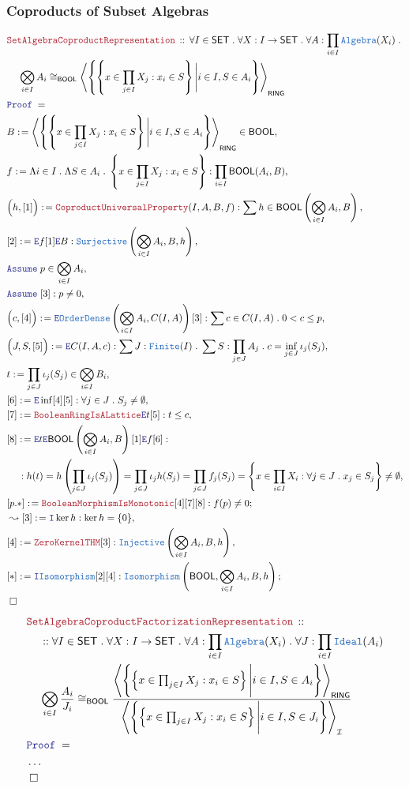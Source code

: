 \documentclass[12pt]{scrartcl}
\newcommand{\TYPE}[1]{\textcolor{NavyBlue}{\mathtt{#1}}}
\newcommand{\LOGIC}[1]{\textcolor{Blue}{\mathtt{#1}}}
\newcommand{\THM}[1]{\textcolor{Maroon}{\mathtt{#1}}}
\renewcommand{\.}{\; . \;}
\newcommand{\de}{: \kern 0.1pc =}
\newcommand{\Act}[1]{\left( #1 \right)}
\newcommand{\Theorem}[2]{& \THM{#1} \, :: \, #2 \\ & \Proof = \\ }
\newcommand{\NewLine}{\\ & \kern 1pc}
\newcommand{\Page}[1]{ \begin{align*} #1 \end{align*}   }
\newcommand{\NoProof}{ & \ldots \\ \EndProof}
\newcommand{\Intro}{\LOGIC{I}}
\newcommand{\Elim}{\LOGIC{E}}
\newcommand{\Surj}{\TYPE{Surjective}}
\newcommand{\Inj}{\TYPE{Injective}}
\newcommand{\Say}[3]{& #1 \de #2 : #3, \\}
\newcommand{\SayIn}[3]{& #1 \de #2 \in #3, \\}
\newcommand{\Conclude}[3]{& #1 \de #2 : #3; \\}
\newcommand{\Derive}[3]{& \leadsto #1 \de #2 : #3, \\}
\newcommand{\Assume}[2]{& \LOGIC{Assume} \; #1 : #2, \\}
\newcommand{\AssumeIn}[2]{& \LOGIC{Assume} \; #1 \in #2, \\}
\newcommand{\QED}{\; \square}
\newcommand{\EndProof}{& \QED \\}
\newcommand{\Proof}{\LOGIC{Proof} \; }
\newcommand{\Ideal}{\TYPE{Ideal}}
\newcommand{\I}{\mathcal{I}}
\newcommand{\SET}{\mathsf{SET}}
\newcommand{\RING}{\mathsf{RING}}
\newcommand{\Alg}{\TYPE{Algebra}}
\newcommand{\OD}{\TYPE{OrderDense}}
\newcommand{\BOOL}{\mathsf{BOOL}}
\begin{document}
\subsubsection{Coproducts of Subset Algebras}
\Page{
	\Theorem{SetAlgebraCoproductRepresentation}
	{
		\forall I \in \SET \.
		\forall X : I \to \SET \.
		\forall A : \prod_{i \in I} \Alg(X_i) \.
		\NewLine
		\bigotimes_{i \in I} A_i \cong_\BOOL
		\left\langle
			\left\{
				\left\{
						x \in \prod_{j \in I} X_j : x_i \in S
				\right\} \Bigg| i \in I, S \in A_i
			\right\}
		\right\rangle_{\RING}
	}
	\SayIn{B}{
		\left\langle
			\left\{
				\left\{
						x \in \prod_{j \in I} X_j : x_i \in S
				\right\} \Bigg| i \in I, S \in A_i
			\right\}
		\right\rangle_{\RING}
	}{\BOOL}	
	\Say{f}{
		\Lambda i \in I \. 
		\Lambda S \in A_i \. 
		\left\{
						x \in \prod_{j \in I} X_j : x_i \in S
		\right\}  
	}{ \prod_{i \in I} \BOOL(A_i,B)  }
	\Say{\Big(h, [1] \Big)}
	{
		\THM{CoproductUniversalProperty}(I,A,B,f)
	}
	{
		\sum h \in \BOOL\left( \bigotimes_{i \in I} A_i, B\right)
	}
	\Say{[2]}{ \Elim f [1]\Elim B }{\Surj\Act{\bigotimes_{i \in I} A_i,B,h}}
	\AssumeIn{p}{\bigotimes_{i \in I} A_i}
	\Assume{[3]}{p \neq 0}	
	\Say{\Big(c,[4]\Big)}{\Elim \OD\Act{\bigotimes_{i \in I} A_i, C(I,A)}[3]}
	{
		\sum c \in C(I,A) \. 0 < c \le p
	}
	\Say{\Big(J,S,[5]\Big)}{\Elim C(I,A,c)}
	{
		\sum J  : \TYPE{Finite}(I) \. 
		\sum S : \prod_{j \in J} A_j \. 
		c = \inf_{j \in J} \iota_j(S_j)
	}
	\SayIn{t}{\prod_{j \in J} \iota_j(S_j)}{\bigotimes_{i \in I} B_i}
	\Say{[6]}{\Elim \inf [4][5]}{\forall j \in J \. S_j \neq \emptyset}
	\Say{[7]}{\THM{BooleanRingIsALattice}\Elim t[5]}{
			t \le c
	}
	\Say{[8]}{
		\Elim t
		\Elim \BOOL\Act{\bigotimes_{i \in I}A_i,B}
		[1]
		\Elim f
		[6]	
	}
	{
	    \NewLine :		
		h(t)  =
		h\Act{ \prod_{j \in J} \iota_j(S_j)} =
		\prod_{j \in J} \iota_j h (S_j)  =
		\prod_{j \in J} f_j(S_j) = 
		\left\{ x \in \prod_{i \in I} X_i : \forall j \in J \.  x_j \in S_j \right\}
		\neq \emptyset
	}
	\Conclude{[p.*]}{\THM{BooleanMorphismIsMonotonic}[4][7][8]}
	{
		f(p) \neq 0	
	}
	\Derive{[3]}{\Intro \ker h}{\ker h = \{0\}}	
	\Say{[4]}{\THM{ZeroKernelTHM}[3]}
	{
		\Inj\Act{\bigotimes_{i \in I} A_i,B,h}
	}
	\Conclude{[*]}{\Intro \TYPE{Isomorphism}[2][4]}
	{
		\TYPE{Isomorphism}\Act{\BOOL,\bigotimes_{i \in I} A_i,B,h}
	}
	\EndProof
}\Page{
	\Theorem{SetAlgebraCoproductFactorizationRepresentation}
	{
		\NewLine ::		
		\forall I \in \SET \.
		\forall X : I \to \SET \.
		\forall A : \prod_{i \in I} \Alg(X_i) \.
		\forall J : \prod_{i \in I} \Ideal(A_i)
		\NewLine
		\bigotimes_{i \in I} \frac{A_i}{J_i} \cong_\BOOL
		\frac{
		\left\langle
			\left\{
				\left\{
						x \in \prod_{j \in I} X_j : x_i \in S
				\right\} \Bigg| i \in I, S \in A_i
			\right\}
		\right\rangle_{\RING}
		}
		{
		\left\langle
			\left\{
				\left\{
						x \in \prod_{j \in I} X_j : x_i \in S
				\right\} \Bigg| i \in I, S \in J_i
			\right\}
		\right\rangle_\I
		}
	}
	\NoProof
}
\newpage
\end{document}
